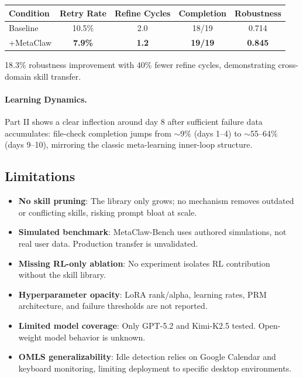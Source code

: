 \documentclass[11pt]{article}
\begin{document}
\begin{center}
\begin{tabular}{lcccc}
\toprule
\textbf{Condition} & \textbf{Retry Rate} & \textbf{Refine Cycles} & \textbf{Completion} & \textbf{Robustness} \\
\midrule
Baseline & 10.5\% & 2.0 & 18/19 & 0.714 \\
+MetaClaw & \textbf{7.9\%} & \textbf{1.2} & \textbf{19/19} & \textbf{0.845} \\
\bottomrule
\end{tabular}
\end{center}

18.3\% robustness improvement with 40\% fewer refine cycles, demonstrating cross-domain skill transfer.

\paragraph{Learning Dynamics.}
Part II shows a clear inflection around day 8 after sufficient failure data accumulates: file-check completion jumps from $\sim$9\% (days 1--4) to $\sim$55--64\% (days 9--10), mirroring the classic meta-learning inner-loop structure.

\subsection{Limitations}
\begin{itemize}
    \item \textbf{No skill pruning}: The library only grows; no mechanism removes outdated or conflicting skills, risking prompt bloat at scale.
    \item \textbf{Simulated benchmark}: MetaClaw-Bench uses authored simulations, not real user data. Production transfer is unvalidated.
    \item \textbf{Missing RL-only ablation}: No experiment isolates RL contribution without the skill library.
    \item \textbf{Hyperparameter opacity}: LoRA rank/alpha, learning rates, PRM architecture, and failure thresholds are not reported.
    \item \textbf{Limited model coverage}: Only GPT-5.2 and Kimi-K2.5 tested. Open-weight model behavior is unknown.
    \item \textbf{OMLS generalizability}: Idle detection relies on Google Calendar and keyboard monitoring, limiting deployment to specific desktop environments.
\end{itemize}
\end{document}

